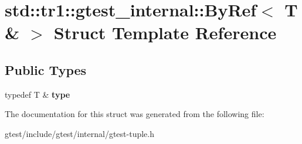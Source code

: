 \hypertarget{structstd_1_1tr1_1_1gtest__internal_1_1ByRef_3_01T_01_6_01_4}{}\section{std\+:\+:tr1\+:\+:gtest\+\_\+internal\+:\+:By\+Ref$<$ T \& $>$ Struct Template Reference}
\label{structstd_1_1tr1_1_1gtest__internal_1_1ByRef_3_01T_01_6_01_4}
\subsection*{Public Types}
\begin{DoxyCompactItemize}
\item 
\mbox{\label{structstd_1_1tr1_1_1gtest__internal_1_1ByRef_3_01T_01_6_01_4_a512382574dbdd736320d68e313801122}} 
typedef T \& {\bfseries type}
\end{DoxyCompactItemize}


The documentation for this struct was generated from the following file\+:\begin{DoxyCompactItemize}
\item 
gtest/include/gtest/internal/gtest-\/tuple.\+h\end{DoxyCompactItemize}
